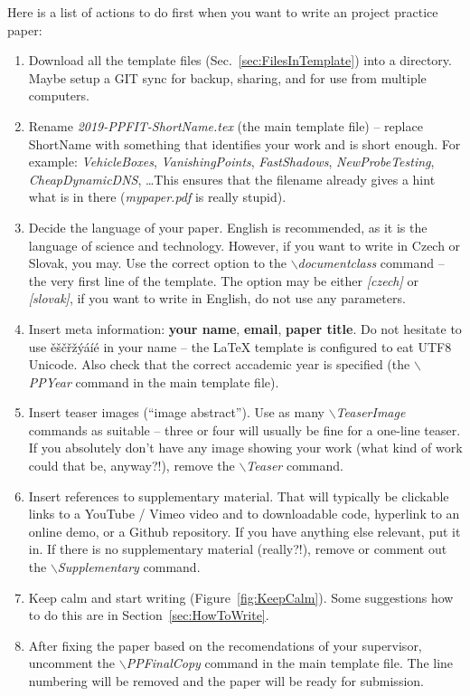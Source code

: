 Here is a list of actions to do first when you want to write an project practice paper:
\begin{enumerate}
	\item Download all the template files (Sec.~\ref{sec:FilesInTemplate}) into a directory. Maybe setup a GIT sync for backup, sharing, and for use from multiple computers.
	\item Rename \textit{2019-PPFIT-ShortName.tex} (the main template file) -- replace ShortName with something that identifies your work and is short enough.  For example: \textit{VehicleBoxes}, \textit{VanishingPoints}, \textit{FastShadows}, \textit{NewProbeTesting}, \textit{CheapDynamicDNS}, \ldots  This ensures that the filename already gives a hint what is in there (\textit{mypaper.pdf} is really stupid).
	\item Decide the language of your paper.  English is recommended, as it is the language of science and technology.  However, if you want to write in Czech or Slovak, you may.  Use the correct option to the \textit{$\backslash$documentclass} command -- the very first line of the template.  The option may be either \textit{[czech]} or \textit{[slovak]}, if you want to write in English, do not use any parameters.
	\item Insert meta information: \textbf{your name}, \textbf{email}, \textbf{paper title}.   Do not hesitate to use ěščřžýáíé in your name -- the \LaTeX{} template is configured to eat UTF8 Unicode. Also check that the correct accademic year is specified (the \textit{$\backslash$PPYear} command in the main template file).
	\item Insert teaser images (``image abstract'').  Use as many \textit{$\backslash$TeaserImage} commands as suitable -- three or four will usually be fine for a one-line teaser.  If you absolutely don't have any image showing your work (what kind of work could that be, anyway?!), remove the \textit{$\backslash$Teaser} command.
	\item Insert references to supplementary material.  That will typically be clickable links to a YouTube / Vimeo video and to downloadable code, hyperlink to an online demo, or a Github repository. If you have anything else relevant, put it in.  If there is no supplementary material (really?!), remove or comment out the \textit{$\backslash$Supplementary} command.
	\item Keep calm and start writing (Figure~\ref{fig:KeepCalm}).  Some suggestions how to do this are in Section~\ref{sec:HowToWrite}.
	\item After fixing the paper based on the recomendations of your supervisor, uncomment the \textit{$\backslash$PPFinalCopy} command in the main template file. The line numbering will be removed and the paper will be ready for submission.
\end{enumerate}

